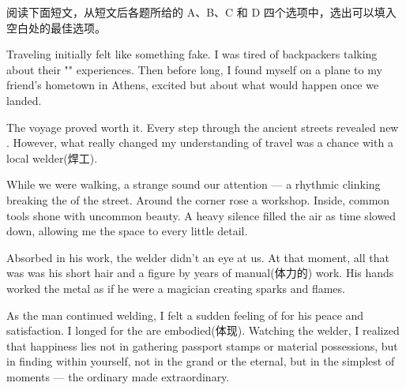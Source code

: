 \documentclass{英语试卷}
\begin{document}
\par 阅读下面短文，从短文后各题所给的 A、B、C 和 D 四个选项中，选出可以填入空白处的最佳选项。\par
\par Traveling initially felt like something fake. I was tired of backpackers talking about their "" experiences. Then before long, I found myself on a plane to my friend's hometown in Athens, excited but \blanknum{} about what would happen once we landed.\par
\par The voyage proved worth it. Every step through the ancient streets revealed new . However, what really changed my understanding of travel was a chance  with a local welder(焊工).\par
\par While we were walking, a strange sound  our attention — a rhythmic clinking breaking the  of the street. Around the corner rose a  workshop. Inside, common tools shone with uncommon beauty. A heavy silence filled the air as time slowed down, allowing me the space to  every little detail.\par
\par Absorbed in his work, the welder didn't  an eye at us. At that moment, all that was  was his short hair and a figure  by years of manual(体力的) work. His hands  worked the metal as if he were a magician creating sparks and flames.\par
\par As the man continued welding, I felt a sudden feeling of  for his peace and satisfaction. I longed for the  are embodied(体现). Watching the welder, I realized that happiness lies not in gathering passport stamps or material possessions, but in finding  within yourself, not in the grand or the eternal, but in the simplest of moments — the ordinary made extraordinary.\par
{}
\end{document}
